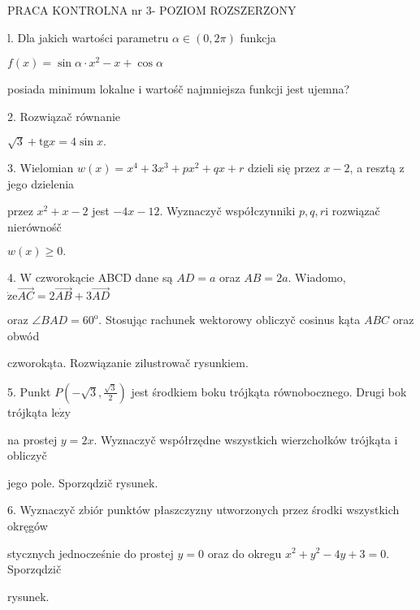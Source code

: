 \documentclass[a4paper,12pt]{article}
\begin{document}
PRACA KONTROLNA nr 3- POZIOM ROZSZERZONY

l. Dla jakich wartości parametru $\alpha\in(0,2\pi)$ funkcja

$ f(x)=\sin\alpha\cdot x^{2}-x+\cos\alpha$

posiada minimum lokalne $\mathrm{i}$ wartośč najmniejsza funkcji jest ujemna?

2. Rozwiązač równanie

$\sqrt{3}+\mathrm{t}\mathrm{g}x=4\sin x.$

3. Wielomian $w(x)=x^{4}+3x^{3}+px^{2}+qx+r$ dzieli się przez $x-2$, a resztą $\mathrm{z}$ jego dzielenia

przez $x^{2}+x-2$ jest $-4x-12$. Wyznaczyč współczynniki $p, q, r\mathrm{i}$ rozwiązač nierównośč

$w(x)\geq 0.$

4. $\mathrm{W}$ czworokącie ABCD dane są $AD=a$ oraz $AB=2a$. Wiadomo, $\dot{\mathrm{z}}\mathrm{e}\vec{AC}=2\vec{AB}+3\vec{AD}$

oraz $\angle BAD=60^{\mathrm{o}}$. Stosując rachunek wektorowy obliczyč cosinus kąta $ABC$ oraz obwód

czworokąta. Rozwiązanie zilustrowač rysunkiem.

5. Punkt $P(-\displaystyle \sqrt{3},\frac{\sqrt{3}}{2})$ jest środkiem boku trójkąta równobocznego. Drugi bok trójkąta $\mathrm{l}\mathrm{e}\dot{\mathrm{z}}\mathrm{y}$

na prostej $y=2x$. Wyznaczyč współrzędne wszystkich wierzchołków trójkąta $\mathrm{i}$ obliczyč

jego pole. Sporzqdzič rysunek.

6. Wyznaczyč zbiór punktów płaszczyzny utworzonych przez środki wszystkich okręgów

stycznych jednocześnie do prostej $y=0$ oraz do okregu $x^{2}+y^{2}-4y+3=0$. Sporzqdzič

rysunek.
\end{document}
